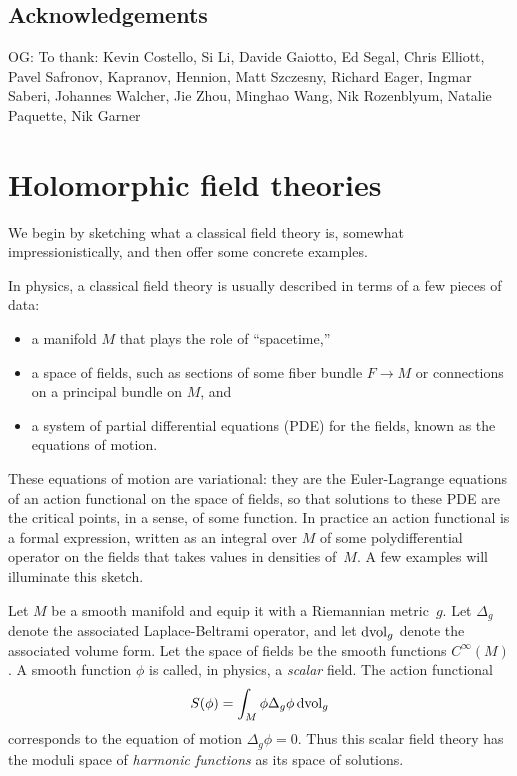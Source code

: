 \documentclass[11pt]{amsart}
\def\owen#1{{\textcolor{violet!50!black}{OG: {#1}}}}
\begin{document}
\subsection{Acknowledgements}

\owen{To thank: Kevin Costello, Si Li, Davide Gaiotto, Ed Segal, Chris Elliott, Pavel Safronov, Kapranov, Hennion, Matt Szczesny, Richard Eager, Ingmar Saberi, Johannes Walcher, Jie Zhou, Minghao Wang, Nik Rozenblyum, Natalie Paquette, Nik Garner}

\section{Holomorphic field theories}
\label{sec: HFT}

We begin by sketching what a classical field theory is, somewhat impressionistically, and then offer some concrete examples.

In physics, a classical field theory is usually described in terms of a few pieces of data:
\begin{itemize}
\item a manifold $M$ that plays the role of ``spacetime,''
\item a space of fields, such as sections of some fiber bundle $F \to M$ or connections on a principal bundle on $M$, and
\item a system of partial differential equations (PDE) for the fields, known as the equations of motion.
\end{itemize}
These equations of motion are variational: 
they are the Euler-Lagrange equations of an action functional on the space of fields,
so that solutions to these PDE are the critical points, in a sense, of some function.
In practice an action functional is a formal expression, 
written as an integral over $M$ of some polydifferential operator on the fields that takes values in densities of~$M$.
A few examples will illuminate this sketch.

\begin{eg}
\label{eg: massless scalar}
Let $M$ be a smooth manifold and equip it with a Riemannian metric~$g$.
Let $\Delta_g$ denote the associated Laplace-Beltrami operator, 
and let ${\rm d}{\rm vol}_g$ denote the associated volume form.
Let the space of fields be the smooth functions $C^\infty(M)$.
A smooth function $\phi$ is called, in physics, a {\em scalar} field.
The action functional
\[
S(\phi) = \int_M \phi \Delta_g \phi \, {\rm d}{\rm vol}_g
\]
corresponds to the equation of motion $\Delta_g \phi = 0$. 
Thus this scalar field theory has the moduli space of {\em harmonic functions} as its space of solutions.
\end{eg}
\end{document}
